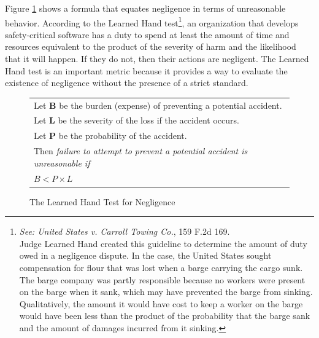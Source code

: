 \documentclass[12pt]{report}
\newenvironment{narrow}[2]{ 
 \begin{list}{}{ 
   \setlength{\topsep}{0pt} 
   \setlength{\leftmargin}{#1} 
   \setlength{\rightmargin}{#2} 
   \setlength{\listparindent}{\parindent} 
   \setlength{\itemindent}{\parindent} 
   \setlength{\parsep}{\parskip}} 
 \item[]}{\end{list}}
\begin{document}
Figure \ref{fig:handtest} shows a formula that equates negligence in terms of unreasonable behavior.  According to the Learned Hand test\footnote{\textit{See: United States v. Carroll Towing Co.}, 159 F.2d 169.\\ Judge Learned Hand created this guideline to determine the amount of duty owed in a negligence dispute. In the case, the United States sought compensation for flour that was lost when a barge carrying the cargo sunk. The barge company was partly responsible because no workers were present on the barge when it sank, which may have prevented the barge from sinking. Qualitatively, the amount it would have cost to keep a worker on the barge would have been less than the product of the probability that the barge sank and the amount of damages incurred from it sinking.}, an organization that develops safety-critical software has a duty to spend at least the amount of time and resources equivalent to the product of the severity of harm and the likelihood that it will happen. If they do not, then their actions are negligent. The Learned Hand test is an important metric because it provides a way to evaluate the existence of negligence without the presence of a strict standard.

\begin{figure}
\begin{narrow}{-1.5in}{-1.5in}\begin{center}
\begin{tabular}{|l|}
\hline
	Let \textbf{B} be the burden (expense) of preventing a potential accident.\\
	Let \textbf{L} be the severity of the loss if the accident occurs.\\
	Let \textbf{P} be the probability of the accident.\\[6pt]
	Then \textit{failure to attempt to prevent a potential accident is 
	unreasonable if}\\[8pt]

      \centerline{\(B < P \times L\)}
\\[3pt]
\hline
\end{tabular}
\end{center}\end{narrow}
\caption{The Learned Hand Test for Negligence}
\label{fig:handtest}
\end{figure}
\end{document}
